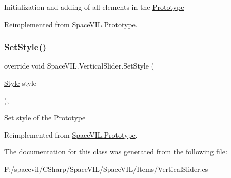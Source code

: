 Initialization and adding of all elements in the \mbox{\hyperlink{class_space_v_i_l_1_1_prototype}{Prototype}} 



Reimplemented from \mbox{\hyperlink{class_space_v_i_l_1_1_prototype_ac3379fe02923ee155b5b0084abf27420}{Space\+V\+I\+L.\+Prototype}}.

\mbox{\label{class_space_v_i_l_1_1_vertical_slider_af6e1f3b91c48cecf0bd791c787d3fe0d}} 
\subsubsection{\texorpdfstring{Set\+Style()}{SetStyle()}}
{\footnotesize\ttfamily override void Space\+V\+I\+L.\+Vertical\+Slider.\+Set\+Style (\begin{DoxyParamCaption}\item[{\mbox{\hyperlink{class_space_v_i_l_1_1_decorations_1_1_style}{Style}}}]{style }\end{DoxyParamCaption})\hspace{0.3cm}{\ttfamily [inline]}, {\ttfamily [virtual]}}



Set style of the \mbox{\hyperlink{class_space_v_i_l_1_1_prototype}{Prototype}} 



Reimplemented from \mbox{\hyperlink{class_space_v_i_l_1_1_prototype_ae96644a6ace490afb376fb542161e541}{Space\+V\+I\+L.\+Prototype}}.



The documentation for this class was generated from the following file\+:\begin{DoxyCompactItemize}
\item 
F\+:/spacevil/\+C\+Sharp/\+Space\+V\+I\+L/\+Space\+V\+I\+L/\+Items/Vertical\+Slider.\+cs\end{DoxyCompactItemize}
